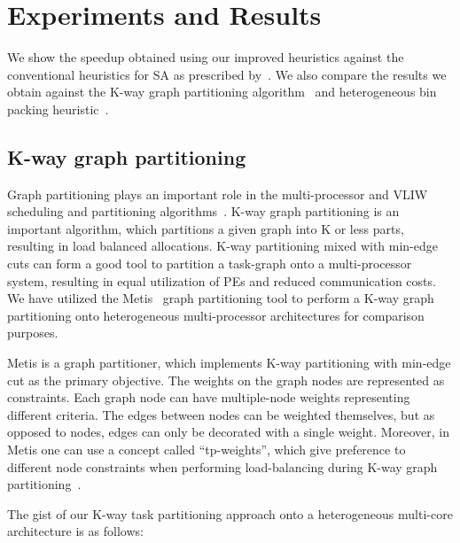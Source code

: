 \section{Experiments and Results}

We show the speedup obtained using our improved heuristics against the
conventional heuristics for SA as prescribed by~\cite{hors06}. We also
compare the results we obtain against the K-way graph partitioning
algorithm~\cite{gkar95} and heterogeneous bin packing
heuristic~\cite{mmar11}.

\subsection{K-way graph partitioning}
\label{sec:k-way-graph}

Graph partitioning plays an important role in the multi-processor and
VLIW scheduling and partitioning
algorithms~\cite{aale01,kpur99,enys98}. K-way graph partitioning is an
important algorithm, which partitions a given graph into K or less
parts, resulting in load balanced allocations. K-way partitioning mixed
with min-edge cuts can form a good tool to partition a task-graph onto a
multi-processor system, resulting in equal utilization of PEs and
reduced communication costs. We have utilized the Metis~\cite{gkar95}
graph partitioning tool to perform a K-way graph partitioning onto
heterogeneous multi-processor architectures for comparison purposes.

Metis is a graph partitioner, which implements K-way partitioning with
min-edge cut as the primary objective. The weights on the graph nodes
are represented as constraints. Each graph node can have multiple-node
weights representing different criteria. The edges between nodes can be
weighted themselves, but as opposed to nodes, edges can only be
decorated with a single weight. Moreover, in Metis one can use a concept
called ``tp-weights'', which give preference to different node
constraints when performing load-balancing during K-way graph
partitioning~\cite{gkar95}. %

The gist of our K-way task partitioning approach onto a heterogeneous
multi-core architecture is as follows:

